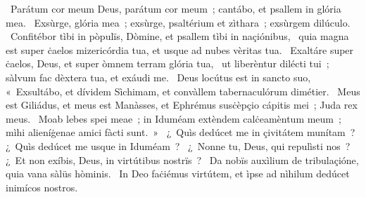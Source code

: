 \psalmChapterWithInscription{}
{ }
{%
~Parátum cor meum Deus, parátum cor meum~; cantábo, et psallem in glória mea. 
~Exsùrge, glória mea~; exsùrge, psaltérium et zìthara~; exsùrgem dilúculo. 
~Confitébor tìbi in pòpulïs, Dòmine, et psallem tìbi in naçiónibus, 
~quia magna est super ċaelos mizericórdia tua, et usque ad nubes vèritas tua. 
~Exaltáre super ċaelos, Deus, et super òmnem terram glória tua, 
~ut liberèntur dilécti tui~; sàlvum fac dèxtera tua, et exáudi me. 
~Deus locútus est in sancto suo, «~Exsultábo, et dívidem Sìchimam, et convàllem tabernaculórum dimétier. 
~Meus est Giliádus, et meus est Manàsses, et Ephrémus susċèpçio cápitis mei~; Juda rex meus. 
~Moab lebes spei meae~; in Iduméam extèndem calċeamèntum meum~; mìhi alieníġenae amici fàcti sunt.~»
~¿~Quìs dedúcet me in çivitátem munítam~? ¿~Quìs dedúcet me usque in Iduméam~? 
~¿~Nonne tu, Deus, qui repulìsti nos~? ¿~Et non exíbis, Deus, in virtútibus nostrïs~? 
~Da nobïs auxìlium de tribulaçióne, quia vana sàlüs hòminis. 
~In Deo faċiémus virtútem, et ìpse ad nìhilum dedúcet inimícos nostros. 
}
